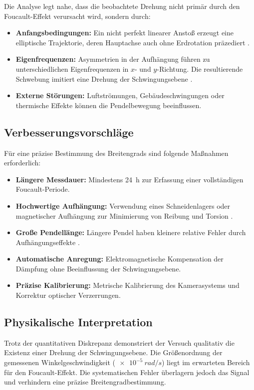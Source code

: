 \documentclass[a4paper,12pt]{article}
\begin{document}
Die Analyse legt nahe, dass die beobachtete Drehung nicht primär durch den Foucault-Effekt verursacht wird, sondern durch:

\begin{itemize}
\item \textbf{Anfangsbedingungen:} Ein nicht perfekt linearer Anstoß erzeugt eine elliptische Trajektorie, deren Hauptachse auch ohne Erdrotation präzediert \cite[S.~92]{demtroeder2018}.
\item \textbf{Eigenfrequenzen:} Asymmetrien in der Aufhängung führen zu unterschiedlichen Eigenfrequenzen in $x$- und $y$-Richtung. Die resultierende Schwebung imitiert eine Drehung der Schwingungsebene \cite[S.~158]{nolting2023}.
\item \textbf{Externe Störungen:} Luftströmungen, Gebäudeschwingungen oder thermische Effekte können die Pendelbewegung beeinflussen.
\end{itemize}

\subsection{Verbesserungsvorschläge}

Für eine präzise Bestimmung des Breitengrads sind folgende Maßnahmen erforderlich:

\begin{itemize}
\item \textbf{Längere Messdauer:} Mindestens \qty{24}{h} zur Erfassung einer vollständigen Foucault-Periode.
\item \textbf{Hochwertige Aufhängung:} Verwendung eines Schneidenlagers oder magnetischer Aufhängung zur Minimierung von Reibung und Torsion \cite[S.~91]{demtroeder2018}.
\item \textbf{Große Pendellänge:} Längere Pendel haben kleinere relative Fehler durch Aufhängungseffekte \cite[S.~158]{nolting2023}.
\item \textbf{Automatische Anregung:} Elektromagnetische Kompensation der Dämpfung ohne Beeinflussung der Schwingungsebene.
\item \textbf{Präzise Kalibrierung:} Metrische Kalibrierung des Kamerasystems und Korrektur optischer Verzerrungen.
\end{itemize}

\subsection{Physikalische Interpretation}

Trotz der quantitativen Diskrepanz demonstriert der Versuch qualitativ die Existenz einer Drehung der Schwingungsebene. Die Größenordnung der gemessenen Winkelgeschwindigkeit ($\qty{e-5}{rad/s}$) liegt im erwarteten Bereich für den Foucault-Effekt. Die systematischen Fehler überlagern jedoch das Signal und verhindern eine präzise Breitengradbestimmung.
\end{document}
